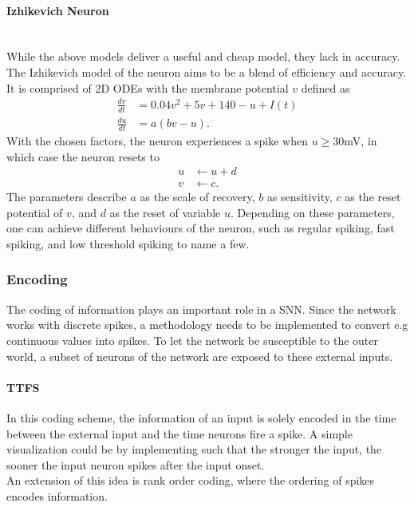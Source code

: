 \paragraph{Izhikevich Neuron}\mbox{}\\
While the above models deliver a useful and cheap model, they lack in accuracy. The Izhikevich model \cite{izhikevich_simple_2003} of the neuron aims to be a blend of efficiency and accuracy. It is comprised of 2D ODEs with the membrane potential $v$ defined as
\begin{equation}
\begin{aligned}
\frac{d v}{dt} &= 0.04v^2 + 5v + 140 -u +I(t)\\
\frac{d u}{dt} &= a(bv-u).
\end{aligned}
\end{equation}
With the chosen factors, the neuron experiences a spike when $u\geq30 $mV, in which case the neuron resets to
\begin{equation}
\begin{aligned}
u &\leftarrow u+d\\
v&\leftarrow c.
\end{aligned}
\end{equation}
The parameters describe $a$ as the scale of recovery, $b$ as sensitivity, $c$ as the reset potential of $v$, and $d$ as the reset of variable $u$. Depending on these parameters, one can achieve different behaviours of the neuron, such as regular spiking, fast spiking, and low threshold spiking to name a few.

\subsubsection{Encoding}
The coding of information plays an important role in a \ac{SNN}. Since the network works with discrete spikes, a methodology needs to be implemented to convert e.g continuous values into spikes. To let the network be susceptible to the outer world, a subset of neurons of the network are exposed to these external inputs.
\paragraph{\ac{TTFS}}
In this coding scheme, the information of an input is solely encoded in the time between the external input and the time neurons fire a spike. A simple visualization could be by implementing such that the stronger the input, the sooner the input neuron spikes after the input onset.\\
An extension of this idea is rank order coding, where the ordering of spikes encodes information\cite{thorpe_spike-based_2001}.\\
